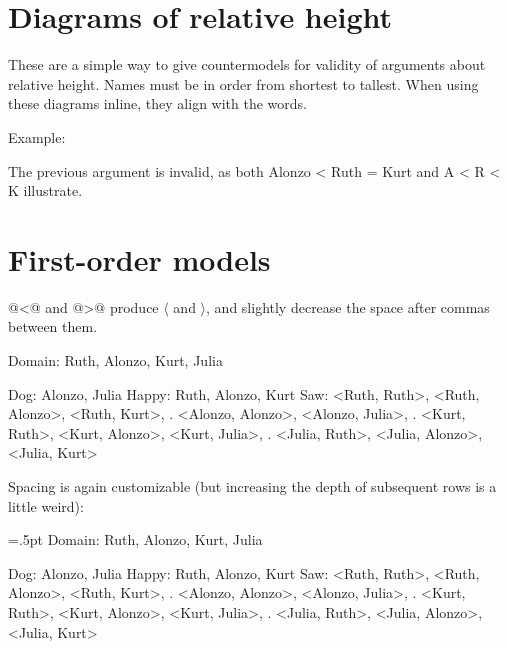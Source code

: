 \section{Diagrams of relative height}

\unorderedlist
\li These are a simple way to give countermodels for validity of arguments about relative height.
\li Names must be in order from shortest to tallest.
\li When using these diagrams inline, they align with the words.
\endunorderedlist

\noindent Example:

\noindent The previous argument is invalid, as both\quad
\heightmodel
 Alonzo < Ruth = Kurt
\endheightmodel
\quad and\quad
\heightmodelinitialbarheight=8pt%
\heightmodelbaradvance=4pt%
\heightmodelbarwidth=4pt%
\heightmodelspace=4pt%
\heightmodel
 A < R < K
\endheightmodel
\quad illustrate.

\pagebreak

\section{First-order models}

@<@ and @>@ produce $\langle$ and $\rangle$, and slightly decrease the space after commas between them.

\firstordermodel 
Domain: Ruth, Alonzo, Kurt, Julia

Dog:    Alonzo, Julia
Happy:  Ruth, Alonzo, Kurt
Saw:    <Ruth, Ruth>, <Ruth, Alonzo>, <Ruth, Kurt>,
   .    <Alonzo, Alonzo>, <Alonzo, Julia>,
   .    <Kurt, Ruth>, <Kurt, Alonzo>, <Kurt, Julia>,
   .    <Julia, Ruth>, <Julia, Alonzo>, <Julia, Kurt>
\endfirstordermodel

\noindent Spacing is again customizable (but increasing the depth of subsequent rows is a little weird):

\fomodelfirstrowheight=18.5pt \fomodelfirstrowdepth=5.5pt%
\fomodelrowheight=13pt        \fomodelrowdepth=3.5pt%
\fomodelpadding=.5pt%
\fomodelspace=8pt%
\firstordermodel 
Domain: Ruth, Alonzo, Kurt, Julia

Dog:    Alonzo, Julia
Happy:  Ruth, Alonzo, Kurt
Saw:    <Ruth, Ruth>, <Ruth, Alonzo>, <Ruth, Kurt>,
   .    <Alonzo, Alonzo>, <Alonzo, Julia>,
   .    <Kurt, Ruth>, <Kurt, Alonzo>, <Kurt, Julia>,
   .    <Julia, Ruth>, <Julia, Alonzo>, <Julia, Kurt>
\endfirstordermodel

\bye
